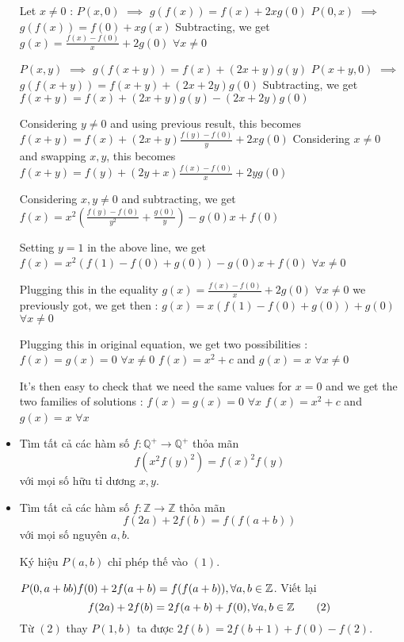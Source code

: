 \documentclass[11pt]{scrartcl}
\begin{document}
\begin{itemize}[label=, leftmargin=0em, itemsep=0.5em]
\begin{sol}
        Let $x\ne 0$ :
        $P(x,0)$ $\implies$ $g(f(x))=f(x)+2xg(0)$
        $P(0,x)$ $\implies$ $g(f(x))=f(0)+xg(x)$
        Subtracting, we get $g(x)=\frac{f(x)-f(0)}x+2g(0)$ $\forall x\ne 0$

        $P(x,y)$ $\implies$ $g(f(x+y))=f(x)+(2x+y)g(y)$
        $P(x+y,0)$ $\implies$ $g(f(x+y))=f(x+y)+(2x+2y)g(0)$
        Subtracting, we get $f(x+y)=f(x)+(2x+y)g(y)-(2x+2y)g(0)$

        Considering $y\ne 0$ and using previous result, this becomes $f(x+y)=f(x)+(2x+y)\frac{f(y)-f(0)}y+2xg(0)$
        Considering $x\ne 0$ and swapping $x,y$, this becomes $f(x+y)=f(y)+(2y+x)\frac{f(x)-f(0)}x+2yg(0)$

        Considering $x,y\ne 0$ and subtracting, we get $f(x)=x^2(\frac{f(y)-f(0)}{y^2}+\frac{g(0)}y)-g(0)x+f(0)$

        Setting $y=1$ in the above line, we get $f(x)=x^2(f(1)-f(0)+g(0))-g(0)x+f(0)$ $\forall x\ne 0$

        Plugging this in the equality $g(x)=\frac{f(x)-f(0)}x+2g(0)$ $\forall x\ne 0$ we previously got, we get then :
        $g(x)=x(f(1)-f(0)+g(0))+g(0)$ $\forall x\ne 0$

        Plugging this in original equation, we get two possibilities :
        $f(x)=g(x)=0$ $\forall x\ne 0$
        $f(x)=x^2+c$ and $g(x)=x$ $\forall x\ne 0$

        It's then easy to check that we need the same values for $x=0$ and we get the two families of solutions :
        $f(x)=g(x)=0$ $\forall x$
        $f(x)=x^2+c$ and $g(x)=x$ $\forall x$
    \end{sol}

    \item \begin{btvn}
        Tìm tất cả các hàm số $f: \mathbb{Q}^+ \to \mathbb{Q}^+$ thỏa mãn
        $$f(x^2f(y)^2)=f(x)^2f(y)$$
        với mọi số hữu tỉ dương $x,y$.
    \end{btvn}


    \item \begin{bt}
        Tìm tất cả các hàm số $f: \mathbb{Z} \to \mathbb{Z}$ thỏa mãn
        \[f(2a)+2f(b)=f(f(a+b)) \tag{1}\]
        với mọi số nguyên $a,b$.
    \end{bt}
    \begin{sol}
        Ký hiệu $P(a,b)$ chỉ phép thế vào $(1)$. 

        $P(0,a + bb) \ra f(0) + 2f(a + b) = f(f(a + b)), \forall a,b \in \bb{Z}$. Viết lại 
        \[
            f(2a) + 2f(b) = 2f(a + b) + f(0) ,\forall a,b \in \mathbb{Z}\tag{2}
        \]
        Từ $(2)$ thay $P(1,b)$ ta được $2f(b) = 2f(b + 1) + f(0) - f(2)$.


\end{sol}
\end{itemize}
\end{document}
